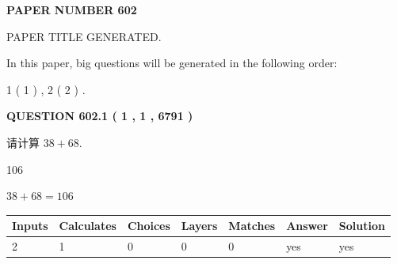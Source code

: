\documentclass{ctexart}
\begin{document}
   
   
   
 {\textbf{ \Large{ PAPER NUMBER  602  }}}
   
   
\vspace{0.2in}
   
   
   
   
   
   
   
   
 \vspace{0.2in}
 
 
 
 
   
   
 PAPER TITLE GENERATED.
   
   
   
\vspace{0.2in}
   
In this paper, big questions will be generated in the following order: 
   
   
   1 ( 1 )
 ,
   2 ( 2 )
 .
  
\vspace{0.2in}
  
{\textbf{\Large{QUESTION
602.1 
 ( 1 , 1 , 6791 )
}}}
  
  
 
请计算 $ %
38 +  %
68 $.
 
 
 
\noindent{}
 
 

106
 
 
\noindent{}
 
 

 
 
 
\noindent{}
 
 

$ %
38 +  %
68=   %
106$
 
 
\noindent{}
 
 

 
   
   
   
   
\noindent\begin{tabular}{|l|l|l|l|l|l|l|}
 \hline
Inputs & Calculates & Choices & Layers & Matches & Answer & Solution \\ \hline
 2  & 
 1  & 
 0
  & 
 0  & 
 0  & 
  yes & 
  yes 
  \\ \hline
 \end{tabular}
   
\end{document}
